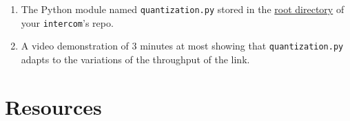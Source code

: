\begin{enumerate}
  \item The Python module named \texttt{quantization.py} stored in the
    \href{https://github.com/Tecnologias-multimedia/intercom}{root
      directory} of your \texttt{intercom}'s repo.
  \item A video demonstration of 3 minutes at most showing that
    \texttt{quantization.py} adapts to the variations of the
    throughput of the link.
\end{enumerate}

\section{Resources}


